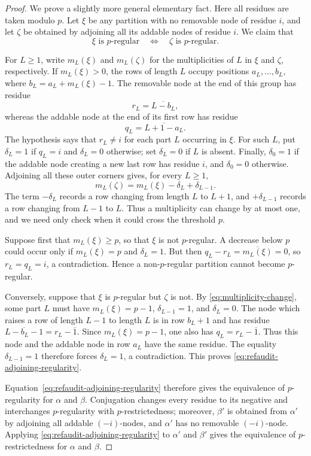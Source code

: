 \documentclass[12pt,reqno,a4paper]{amsart}
\numberwithin{equation}{section}
\numberwithin{figure}{section}
\theoremstyle{plain}
\theoremstyle{definition}
\begin{document}
\begin{proof}
We prove a slightly more general elementary fact.  Here all residues
are taken modulo $p$.  Let $\xi$ be any partition with no
removable node of residue $i$, and let $\zeta$ be obtained by adjoining
all its addable nodes of residue $i$.  We claim that
\begin{equation}\label{eq:refaudit-adjoining-regularity}
\xi\text{ is }p\text{-regular}
\quad\Longleftrightarrow\quad
\zeta\text{ is }p\text{-regular}.
\end{equation}

For $L\geq1$, write $m_L(\xi)$ and $m_L(\zeta)$ for the
multiplicities of $L$ in $\xi$ and $\zeta$, respectively.
If $m_L(\xi)>0$, the rows of length $L$ occupy positions $a_L,\ldots,b_L$,
where $b_L=a_L+m_L(\xi)-1$.  The removable node at the end of this group has
residue
\[
r_L=\overline{L-b_L},
\]
whereas the addable node at the end of its first row has residue
\[
q_L=\overline{L+1-a_L}.
\]
The hypothesis says that $r_L\neq i$ for each part $L$ occurring in
$\xi$.  For such $L$, put $\delta_L=1$ if $q_L=i$ and $\delta_L=0$
otherwise; set $\delta_L=0$ if $L$ is absent.
Finally, $\delta_0=1$ if the addable node creating a new last row
has residue $i$, and $\delta_0=0$ otherwise.  Adjoining all these
outer corners gives, for every $L\geq1$,
\begin{equation}\label{eq:multiplicity-change}
m_L(\zeta)=m_L(\xi)-\delta_L+\delta_{L-1}.
\end{equation}
The term $-\delta_L$ records a row changing from length $L$ to $L+1$,
and $+\delta_{L-1}$ records a row changing from $L-1$ to $L$.
Thus a multiplicity can change by at most one, and we need only check
when it could cross the threshold $p$.

Suppose first that $m_L(\xi)\geq p$, so that $\xi$ is not $p$-regular.
A decrease below $p$ could occur
only if $m_L(\xi)=p$ and $\delta_L=1$.  But then
$q_L-r_L=\overline{m_L(\xi)}=0$, so $r_L=q_L=i$, a contradiction.
Hence a non-$p$-regular partition cannot become
$p$-regular.

Conversely, suppose that $\xi$ is $p$-regular but $\zeta$ is not.
By \eqref{eq:multiplicity-change}, some part $L$ must have
$m_L(\xi)=p-1$, $\delta_{L-1}=1$, and $\delta_L=0$.  The node which
raises a row of length $L-1$ to length $L$ is in row $b_L+1$ and has
residue $\overline{L-b_L-1}=r_L-\overline{1}$.
Since $m_L(\xi)=p-1$, one also has $q_L=r_L-\overline{1}$.
Thus this node and the addable node in row
$a_L$ have the same residue.  The equality $\delta_{L-1}=1$ therefore
forces $\delta_L=1$, a contradiction.  This proves
\eqref{eq:refaudit-adjoining-regularity}.

Equation~\eqref{eq:refaudit-adjoining-regularity}
therefore gives the equivalence of $p$-regularity for $\alpha$ and
$\beta$.  Conjugation changes every residue to its negative and
interchanges $p$-regularity with $p$-restrictedness; moreover,
$\beta'$ is obtained from $\alpha'$ by adjoining all addable
$(-i)$-nodes, and $\alpha'$ has no removable $(-i)$-node.  Applying
\eqref{eq:refaudit-adjoining-regularity} to $\alpha'$ and $\beta'$
gives the equivalence of $p$-restrictedness for $\alpha$ and $\beta$.
\end{proof}
\end{document}
